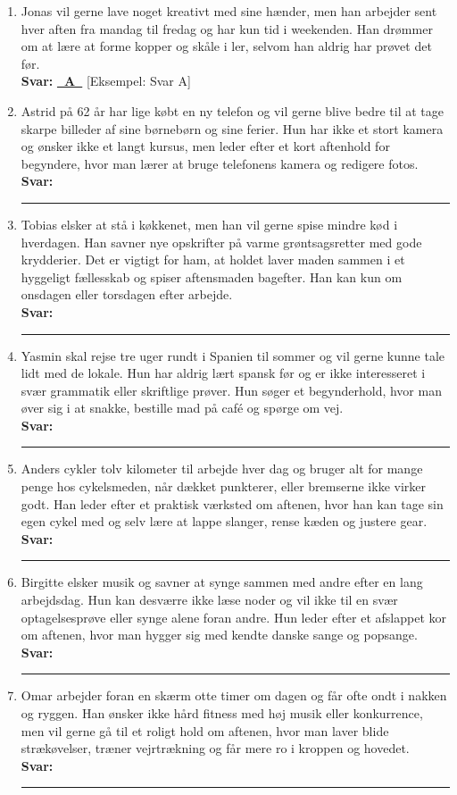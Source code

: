 \begin{enumerate}
  \item[(0)] Jonas vil gerne lave noget kreativt med sine hænder, men han arbejder sent hver aften fra mandag til fredag og har kun tid i weekenden. Han drømmer om at lære at forme kopper og skåle i ler, selvom han aldrig har prøvet det før.\\
  \textbf{Svar:} \underline{\textbf{\ A\ }} \quad \textcolor{NCDGray}{\small [Eksempel: Svar A]}

  \item[1.] Astrid på 62 år har lige købt en ny telefon og vil gerne blive bedre til at tage skarpe billeder af sine børnebørn og sine ferier. Hun har ikke et stort kamera og ønsker ikke et langt kursus, men leder efter et kort aftenhold for begyndere, hvor man lærer at bruge telefonens kamera og redigere fotos.\\
  \textbf{Svar:} \rule{1.2cm}{0.4pt}

  \item[2.] Tobias elsker at stå i køkkenet, men han vil gerne spise mindre kød i hverdagen. Han savner nye opskrifter på varme grøntsagsretter med gode krydderier. Det er vigtigt for ham, at holdet laver maden sammen i et hyggeligt fællesskab og spiser aftensmaden bagefter. Han kan kun om onsdagen eller torsdagen efter arbejde.\\
  \textbf{Svar:} \rule{1.2cm}{0.4pt}

  \item[3.] Yasmin skal rejse tre uger rundt i Spanien til sommer og vil gerne kunne tale lidt med de lokale. Hun har aldrig lært spansk før og er ikke interesseret i svær grammatik eller skriftlige prøver. Hun søger et begynderhold, hvor man øver sig i at snakke, bestille mad på café og spørge om vej.\\
  \textbf{Svar:} \rule{1.2cm}{0.4pt}

  \item[4.] Anders cykler tolv kilometer til arbejde hver dag og bruger alt for mange penge hos cykelsmeden, når dækket punkterer, eller bremserne ikke virker godt. Han leder efter et praktisk værksted om aftenen, hvor han kan tage sin egen cykel med og selv lære at lappe slanger, rense kæden og justere gear.\\
  \textbf{Svar:} \rule{1.2cm}{0.4pt}

  \item[5.] Birgitte elsker musik og savner at synge sammen med andre efter en lang arbejdsdag. Hun kan desværre ikke læse noder og vil ikke til en svær optagelsesprøve eller synge alene foran andre. Hun leder efter et afslappet kor om aftenen, hvor man hygger sig med kendte danske sange og popsange.\\
  \textbf{Svar:} \rule{1.2cm}{0.4pt}

  \item[6.] Omar arbejder foran en skærm otte timer om dagen og får ofte ondt i nakken og ryggen. Han ønsker ikke hård fitness med høj musik eller konkurrence, men vil gerne gå til et roligt hold om aftenen, hvor man laver blide strækøvelser, træner vejrtrækning og får mere ro i kroppen og hovedet.\\
  \textbf{Svar:} \rule{1.2cm}{0.4pt}
\end{enumerate}

